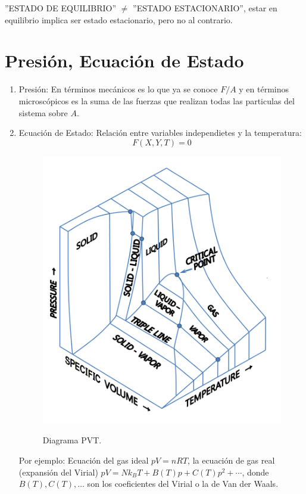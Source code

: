 ''ESTADO DE EQUILIBRIO'' $\neq$ ''ESTADO ESTACIONARIO'', estar en equilibrio implica ser estado estacionario, pero no al contrario.


\section{Presión, Ecuación de Estado}
\begin{enumerate}
	\item Presión: En términos mecánicos es lo que ya se conoce $F/A$ y en términos microscópicos es la suma de las fuerzas que realizan todas las particulas del sistema sobre $A$.
	\item Ecuación de Estado: Relación entre variables independietes y la temperatura:
		$$ F (X,Y,T) = 0 $$
	\begin{figure}[H]
		\centering
		\includegraphics[scale=0.2]{./img/PVT_diagram.png}
		\label{PVT}
		\caption{Diagrama PVT.}
	\end{figure}
	Por ejemplo: Ecuación del gas ideal $pV = nRT$, la ecuación de gas real (expansión del Virial) $pV = Nk_B T + B(T) p + C(T) p^2 + \cdots$, donde $B(T), C(T), \ldots$ son los coeficientes del Virial o la de Van der Waals.

\end{enumerate}
